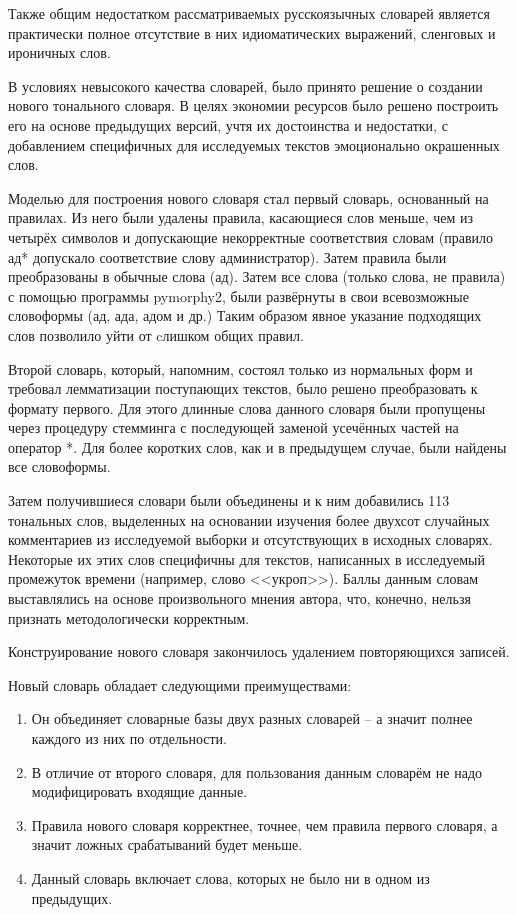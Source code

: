 Также общим недостатком рассматриваемых русскоязычных словарей является практически полное отсутствие в них идиоматических выражений, сленговых и ироничных слов.

В условиях невысокого качества словарей, было принято решение о создании нового тонального словаря. В целях экономии ресурсов было решено построить его на основе предыдущих версий, учтя их достоинства и недостатки, с добавлением специфичных для исследуемых текстов эмоционально окрашенных слов.

Моделью для построения нового словаря стал первый словарь, основанный на правилах. Из него были удалены правила, касающиеся слов меньше, чем из четырёх символов и допускающие некорректные соответствия словам (правило ад* допускало соответствие слову администратор). Затем правила были преобразованы в обычные слова (ад). Затем все слова (только слова, не правила) с помощью программы pymorphy2, были развёрнуты в свои всевозможные словоформы (ад, ада, адом и др.) Таким образом явное указание подходящих слов позволило уйти от cлишком общих правил.

Второй словарь, который, напомним, состоял только из нормальных форм и требовал лемматизации поступающих текстов, было решено преобразовать к формату первого. Для этого длинные слова данного словаря были пропущены через процедуру стемминга с последующей заменой усечённых частей на оператор *. Для более коротких слов, как и в предыдущем случае, были найдены все словоформы.

Затем получившиеся словари были объединены и к ним добавились 113 тональных слов, выделенных на основании изучения более двухсот случайных комментариев из исследуемой выборки и отсутствующих в исходных словарях. Некоторые их этих слов специфичны для текстов, написанных в исследуемый промежуток времени (например, слово <<укроп>>). Баллы данным словам выставлялись на основе произвольного мнения автора, что, конечно, нельзя признать методологически корректным.

Конструирование нового словаря закончилось удалением повторяющихся записей.

Новый словарь обладает следующими преимуществами:

\begin{enumerate}
\item Он объединяет словарные базы двух разных словарей -- а значит полнее каждого из них по отдельности.
\item В отличие от второго словаря, для пользования данным словарём не надо модифицировать входящие данные.
\item Правила нового словаря корректнее, точнее, чем правила первого словаря, а значит ложных срабатываний будет меньше.
\item Данный словарь включает слова, которых не было ни в одном из предыдущих.
\end{enumerate}

